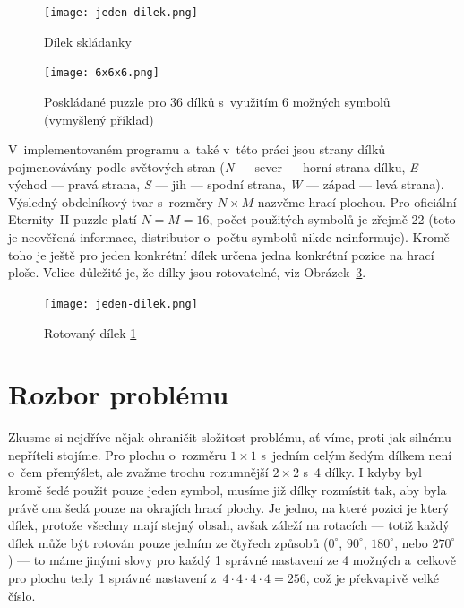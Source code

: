 \documentclass[11pt, titlepage]{report}
\begin{document}
\begin{figure}[ht]
\centering
\texttt{[image: jeden-dilek.png]}
\caption{Dílek skládanky}
\label{jeden-dilek}
\end{figure}

\begin{figure}[ht]
\centering
\texttt{[image: 6x6x6.png]}
\caption{Poskládané puzzle pro 36 dílků s~využitím 6 možných symbolů (vymyšlený příklad)}
\label{plocha}
\end{figure}

\newpage V~implementovaném programu a~také v~této práci jsou strany dílků pojmenovávány podle světových stran (\emph{N} --- sever --- horní strana dílku, \emph{E} --- východ --- pravá strana, \emph{S} --- jih --- spodní strana, \emph{W} --- západ --- levá strana). Výsledný obdelníkový tvar s~rozměry $N \times M$ nazvěme hrací plochou. Pro oficiální Eternity~II puzzle platí $N = M = 16$, počet použitých symbolů je zřejmě 22 (toto je neověřená informace, distributor o~počtu symbolů nikde neinformuje). Kromě toho je ještě pro jeden konkrétní dílek určena jedna konkrétní pozice na hrací ploše. Velice důležité je, že dílky jsou rotovatelné, viz Obrázek~\ref{jeden-dilek-rot}.

\begin{figure}[ht]
\centering
\texttt{[image: jeden-dilek.png]}
\caption{Rotovaný dílek \ref{jeden-dilek}}
\label{jeden-dilek-rot}
\end{figure}


\section{Rozbor problému}
\label{sec:problem-rozbor}

Zkusme si nejdříve nějak ohraničit složitost problému, ať víme, proti jak silnému nepříteli stojíme. Pro plochu o~rozměru $1 \times 1$ s~jedním celým šedým dílkem není o~čem přemýšlet, ale zvažme trochu rozumnější $2 \times 2$ s~4 dílky. I kdyby byl kromě šedé použit pouze jeden symbol, musíme již dílky rozmístit tak, aby byla právě ona šedá pouze na okrajích hrací plochy. Je jedno, na které pozici je který dílek, protože všechny mají stejný obsah, avšak záleží na rotacích --- totiž každý dílek může být rotován pouze jedním ze čtyřech způsobů ($0^\circ$, $90^\circ$, $180^\circ$, nebo $270^\circ$) --- to máme jinými slovy pro každý 1 správné nastavení ze 4 možných a~celkově pro plochu tedy 1 správné nastavení z~$4 \cdot 4 \cdot 4 \cdot 4 = 256$, což je překvapivě velké číslo.
\end{document}
